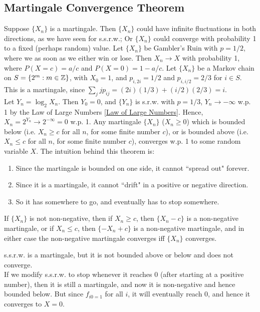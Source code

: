 \documentclass[11pt]{article}
\begin{document}
    \subsection{Martingale Convergence Theorem}
    Suppose $\{X_n\}$ is a martingale. Then $\{X_n\}$ could have infinite fluctuations in both directions, as we have seen for s.s.r.w.; Or $\{X_n\}$ could converge with probability 1 to a fixed (perhaps random) value.
    \example
    Let $\{X_n\}$ be Gambler's Ruin with $p = 1/2$, where we  as soon as we either win or lose. Then $X_n \rightarrow X$ with probability 1, where $P(X = c) = a/c$ and $P(X=0) = 1 - a/c$.
    \example
    Let $\{X_n\}$ be a Markov chain on $S = \{2^m: m \in \mathbb{Z}\}$, with $X_0 = 1$, and $p_{i,2i} = 1/2$ and $p_{i, i/2} = 2/3$ for $i \in S$. This is a martingale, since $\sum_{j} jp_{ij} = (2i)(1/3) + (i/2)(2/3) = i$.\\
    Let $Y_n = \log_2 X_n$. Then $Y_0 = 0$, and $\{Y_n\}$ is s.r.w. with $p = 1/3$, $Y_n \rightarrow -\infty$ w.p. 1 by the Law of Large Numbers \ref{Law of Large Numbers}. Hence, $X_n = 2^{Y_n} \rightarrow 2^{-\infty} = 0$ w.p. 1.
     Any martingale $\{X_n\}$ ($X_n \geq 0$) which is bounded below (i.e. $X_n \geq c$ for all $n$, for some finite number $c$), or is bounded above (i.e. $X_n \leq c$ for all $n$, for some finite number $c$), converges w.p. 1 to some random variable $X$.
    \remark
    The intuition behind this theorem is:
    \begin{enumerate}
    	\item Since the martingale is bounded on one side, it cannot ``spread out" forever.
    	\item Since it is a martingale, it cannot ``drift" in a positive or negative direction.
    	\item So it has somewhere to go, and eventually has to stop somewhere.
    \end{enumerate}
   	\remark
   	If $\{X_n\}$ is not non-negative, then if $X_n \geq c$, then $\{X_n - c\}$ is a non-negative martingale, or if $X_n \leq c$, then $\{-X_n + c\}$ is a non-negative martingale, and in either case the non-negative martingale converges iff $\{X_n\}$ converges.
   	
   	s.s.r.w. is a martingale, but it is not bounded above or below and does not converge.\\
   	If we modify s.s.r.w. to stop whenever it reaches 0 (after starting at a positive number), then it is still a martingale, and now it is non-negative and hence bounded below. But since $f_{i0 = 1}$ for all $i$, it will eventually reach 0, and hence it converges to $X = 0$.
\end{document}
